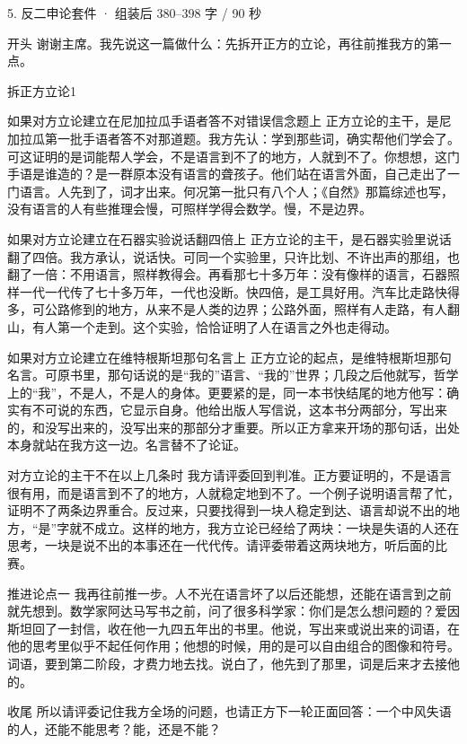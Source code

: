 \documentclass[script,con]{debate}
\begin{document}
\begin{kit}{5. 反二申论}{套件 · 组装后 380–398 字 / 90 秒}
\begin{fixed}{开头}
谢谢主席。我先说这一篇做什么：先拆开正方的立论，再往前推我方的第一点。
\end{fixed}
\begin{pick}{拆正方立论}{1}
\begin{module}{如果对方立论建立在尼加拉瓜手语者答不对错误信念题上}
正方立论的主干，是尼加拉瓜第一批手语者答不对那道题。我方先认：学到那些词，确实帮他们学会了。可这证明的是词能帮人学会，不是语言到不了的地方，人就到不了。你想想，这门手语是谁造的？是一群原本没有语言的聋孩子。他们站在语言外面，自己走出了一门语言。人先到了，词才出来。何况第一批只有八个人；《自然》那篇综述也写，没有语言的人有些推理会慢，可照样学得会数学。慢，不是边界。
\end{module}
\begin{module}{如果对方立论建立在石器实验说话翻四倍上}
正方立论的主干，是石器实验里说话翻了四倍。我方承认，说话快。可同一个实验里，只许比划、不许出声的那组，也翻了一倍：不用语言，照样教得会。再看那七十多万年：没有像样的语言，石器照样一代一代传了七十多万年，一代也没断。快四倍，是工具好用。汽车比走路快得多，可公路修到的地方，从来不是人类的边界；公路外面，照样有人走路，有人翻山，有人第一个走到。这个实验，恰恰证明了人在语言之外也走得动。
\end{module}
\begin{module}{如果对方立论建立在维特根斯坦那句名言上}
正方立论的起点，是维特根斯坦那句名言。可原书里，那句话说的是“我的”语言、“我的”世界；几段之后他就写，哲学上的“我”，不是人，不是人的身体。更要紧的是，同一本书快结尾的地方他写：确实有不可说的东西，它显示自身。他给出版人写信说，这本书分两部分，写出来的，和没写出来的，没写出来的那部分才重要。所以正方拿来开场的那句话，出处本身就站在我方这一边。名言替不了论证。
\end{module}
\begin{fallback}{对方立论的主干不在以上几条时}
我方请评委回到判准。正方要证明的，不是语言很有用，而是语言到不了的地方，人就稳定地到不了。一个例子说明语言帮了忙，证明不了两条边界重合。反过来，只要找得到一块人稳定到达、语言却说不出的地方，“是”字就不成立。这样的地方，我方立论已经给了两块：一块是失语的人还在思考，一块是说不出的本事还在一代代传。请评委带着这两块地方，听后面的比赛。
\end{fallback}
\end{pick}
\begin{fixed}{推进论点一}
我再往前推一步。人不光在语言坏了以后还能想，还能在语言到之前就先想到。数学家阿达马写书之前，问了很多科学家：你们是怎么想问题的？爱因斯坦回了一封信，收在他一九四五年出的书里。他说，写出来或说出来的词语，在他的思考里似乎不起任何作用；他想的时候，用的是可以自由组合的图像和符号。词语，要到第二阶段，才费力地去找。说白了，他先到了那里，词是后来才去接他的。
\end{fixed}
\begin{fixed}{收尾}
所以请评委记住我方全场的问题，也请正方下一轮正面回答：一个中风失语的人，还能不能思考？能，还是不能？
\end{fixed}
\end{kit}
\end{document}
